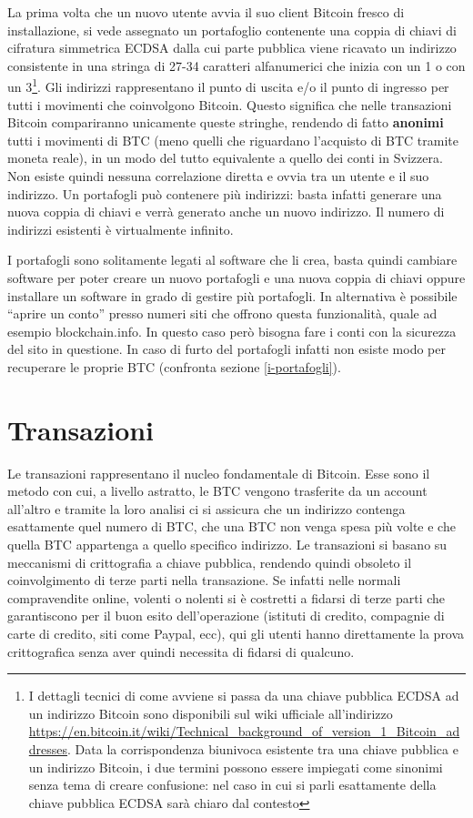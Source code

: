 La prima volta che un nuovo utente avvia il suo client Bitcoin fresco di installazione, si vede assegnato un portafoglio contenente una coppia di chiavi di cifratura simmetrica ECDSA dalla cui parte pubblica viene ricavato un indirizzo consistente in una stringa di 27-34 caratteri alfanumerici che inizia con un 1 o con un 3\footnote{I dettagli tecnici di come avviene si passa da una chiave pubblica ECDSA ad un indirizzo Bitcoin sono disponibili sul wiki ufficiale all'indirizzo \url{https://en.bitcoin.it/wiki/Technical_background_of_version_1_Bitcoin_addresses}. Data la corrispondenza biunivoca esistente tra una chiave pubblica e un indirizzo Bitcoin, i due termini possono essere impiegati come sinonimi senza tema di creare confusione: nel caso in cui si parli esattamente della chiave pubblica ECDSA sarà chiaro dal contesto}. Gli indirizzi rappresentano il punto di uscita e/o il punto di ingresso per tutti i movimenti che coinvolgono Bitcoin. Questo significa che nelle transazioni Bitcoin compariranno unicamente queste stringhe, rendendo di fatto \textbf{anonimi} tutti i movimenti di BTC (meno quelli che riguardano l'acquisto di BTC tramite moneta reale), in un modo del tutto equivalente a quello dei conti in Svizzera. Non esiste quindi nessuna correlazione diretta e ovvia tra un utente e il suo indirizzo. Un portafogli può contenere più indirizzi: basta infatti generare una nuova coppia di chiavi e verrà generato anche un nuovo indirizzo. Il numero di indirizzi esistenti è virtualmente infinito.

I portafogli sono solitamente legati al software che li crea, basta quindi cambiare software per poter creare un nuovo portafogli e una nuova coppia di chiavi oppure installare un software in grado di gestire più portafogli. In alternativa è possibile ``aprire un conto'' presso numeri siti che offrono questa funzionalità, quale ad esempio blockchain.info. In questo caso però bisogna fare i conti con la sicurezza del sito in questione. In caso di furto del portafogli infatti non esiste modo per recuperare le proprie BTC (confronta sezione \ref{i-portafogli}).

\section{Transazioni}\label{transazioni}

Le transazioni rappresentano il nucleo fondamentale di Bitcoin. Esse sono il metodo con cui, a livello astratto, le BTC vengono trasferite da un account all'altro e tramite la loro analisi ci si assicura che un indirizzo contenga esattamente quel numero di BTC, che una BTC non venga spesa più volte e che quella BTC appartenga a quello specifico indirizzo. Le transazioni si basano su meccanismi di crittografia a chiave pubblica, rendendo quindi obsoleto il coinvolgimento di terze parti nella transazione. Se infatti nelle normali compravendite online, volenti o nolenti si è costretti a fidarsi di terze parti che garantiscono per il buon esito dell'operazione (istituti di credito, compagnie di carte di credito, siti come Paypal, ecc), qui gli utenti hanno direttamente la prova crittografica senza aver quindi necessita di fidarsi di qualcuno.

